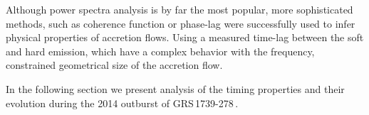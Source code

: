 \documentclass[a4paper,fleqn,usenatbib]{mnras}
\def\grs{{GRS\,1739-278\,}}
\begin{document}
 Although power spectra analysis is by far the most popular, more sophisticated methods, such as coherence function or phase-lag were successfully used to infer physical properties of accretion flows. Using a measured time-lag between the soft and hard emission, which have a complex behavior with the frequency, \cite{1999ApJ...517..355N}  constrained geometrical size of the accretion flow. 


In the following section we present analysis of the timing properties and their evolution during the 2014 outburst of \grs.
\end{document}
